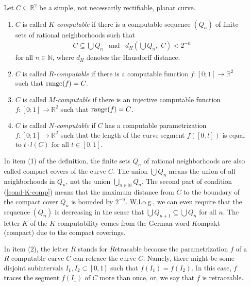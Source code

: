 \documentclass{LMCS}
\theoremstyle{plain}
\def\IN{\mathbb{N}}
\def\IR{\mathbb{R}}
\newcommand{\rang}{\mbox{\rm range}}
\begin{document}
\begin{defi}\label{Def-comp-curve}
Let $C \subseteq \IR^2$ be a simple, not necessarily rectifiable, planar curve.
\begin{enumerate}[(1)]
 \item $C$ is called {\em $K$-computable} if there is a computable sequence $(Q_n)$ of finite sets of rational neighborhoods such that
\begin{eqnarray}\label{cond-K-comp}
C \subseteq \bigcup Q_n &\mbox{and} & d_H\left(\bigcup Q_n,\,\,C\right)<2^{-n}
\end{eqnarray}
for all $n\in \IN$, where $d_H$ denotes the Hausdorff distance.

\item $C$ is called {\em $R$-computable} if there is a computable function $f:[0;1]\rightarrow \IR^2$ such that $\rang(f) =C$.

\item $C$ is called {\em $M$-computable} if there is an injective computable function $f:[0;1]\rightarrow \IR^2$ such that $\rang(f) =C$.

\item $C$ is called {\em $N$-computable} if $C$ has a computable parametrization $f:[0;1]\rightarrow \IR^2$ such that the length of the curve segment $f([0, t])$ is equal to $t\cdot l(C)$ for all $t\in [0,1]$.
\end{enumerate}
\end{defi}

\noindent In item (1) of the definition, the finite sets $Q_n$ of rational neighborhoods are also called compact covers of the curve $C$. The union $\bigcup Q_n$ means the union of all neighborhoods in $Q_n$, not the union $\bigcup_{n\in\IN} Q_n$.   The second part of condition (\ref{cond-K-comp}) means that the maximum distance from $C$ to the boundary of the compact cover $Q_n$ is bounded by $2^{-n}$. W.l.o.g., we can even require that the sequence $(Q_n)$ is decreasing in the sense that $\bigcup Q_{n+1} \subseteq \bigcup Q_n$ for all $n$.  The letter $K$ of the $K$-computability comes from the German word $K$ompakt (compact) due to the compact coverings.

In item (2), the letter $R$ stands for  $R$etracable because the parametrization $f$ of a $R$-computable curve $C$ can retrace the curve $C$. Namely, there might be some disjoint subintervals $I_1, I_2 \subset [0,1]$ such that $f(I_1) = f(I_2)$. In this case, $f$ traces the segment $f(I_1)$ of $C$ more than once, or, we say that $f$ is retraceable.
\end{document}
